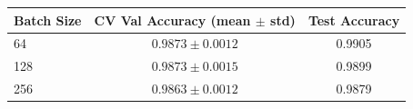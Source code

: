 \begin{tabular}{lcc}
\toprule
Batch Size & CV Val Accuracy (mean $\pm$ std) & Test Accuracy \\
\midrule
  64 & $0.9873 \pm 0.0012$ & 0.9905 \\
  128 & $0.9873 \pm 0.0015$ & 0.9899 \\
  256 & $0.9863 \pm 0.0012$ & 0.9879 \\
\bottomrule
\end{tabular}